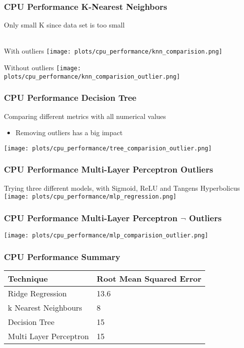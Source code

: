 \documentclass[aspectratio=169]{beamer}
\begin{document}
\begin{frame}{}
\frametitle{CPU Performance K-Nearest Neighbors}
\center Only small K since data set is too small\\ ~\\
\begin{minipage}{0.49\textwidth}
\center With outliers
   \texttt{[image: plots/cpu\_performance/knn\_comparision.png]}
\end{minipage}
 \begin{minipage}{0.49\textwidth}
 \center Without outliers
   \texttt{[image: plots/cpu\_performance/knn\_comparision\_outlier.png]}
\end{minipage}
\end{frame}

\begin{frame}{}
\frametitle{CPU Performance Decision Tree}
\center Comparing different metrics with all numerical values\\
\begin{minipage}{0.3\textwidth}
	\begin{itemize}
	\item Removing outliers has a big impact
	\end{itemize}
\end{minipage}
\begin{minipage}{0.69\textwidth}
  \center \texttt{[image: plots/cpu\_performance/tree\_comparision\_outlier.png]}
\end{minipage}
\end{frame}

\begin{frame}{}
\frametitle{CPU Performance Multi-Layer Perceptron Outliers}
\center Trying three different models, with Sigmoid, ReLU and Tangens Hyperbolicus
    \center \texttt{[image: plots/cpu\_performance/mlp\_regression.png]}
\end{frame}

\begin{frame}{}
\frametitle{CPU Performance Multi-Layer Perceptron $\neg$ Outliers}
    \center \texttt{[image: plots/cpu\_performance/mlp\_comparision\_outlier.png]}
\end{frame}






\begin{frame}{}
\frametitle{CPU Performance Summary}
\begin{table}[]
\begin{tabular}{ll}
\hline
\textbf{Technique}     & \textbf{Root Mean Squared Error} \\ \hline
Ridge Regression       &                  13.6                \\
k Nearest Neighbours   &              8                    \\
Decision Tree          &                15                  \\
Multi Layer Perceptron &             15                     \\ \hline
\end{tabular}
\end{table}
\end{frame}
\end{document}
